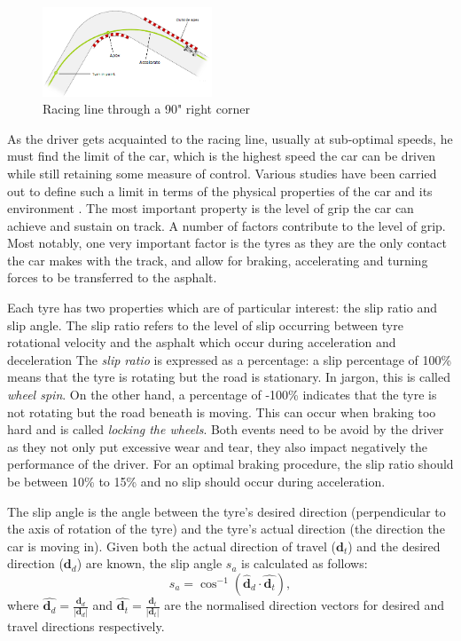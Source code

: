 \documentclass{sig-alternate}
\begin{document}
{\begin{figure}[!htb]
	\centering
	\includegraphics[width=0.45\textwidth]{images/cornerraceline}
	\caption{Racing line through a 90" right corner}
	\label{fig:CornerRaceLine}
\end{figure}

As the driver gets acquainted to the racing line, usually at sub-optimal speeds, he must find the limit of the car, which is the highest speed the car can be driven while still retaining some measure of control. Various studies have been carried out to define such a limit in terms of the physical properties of the car and its environment \cite{beckman1991physics}. The most important property is the level of grip the car can achieve and sustain on track. A number of factors contribute to the level of grip. Most notably, one very important factor is the tyres as they are the only contact the car makes with the track, and allow for braking, accelerating and turning forces to be transferred to the asphalt.

Each tyre has two properties which are of particular interest: the slip ratio and slip angle. The slip ratio refers to the level of slip occurring between tyre rotational velocity and the asphalt which occur during acceleration and deceleration The \emph{slip ratio} is expressed as a percentage: a slip percentage of 100\% means that the tyre is rotating but the road is stationary. In jargon, this is called \emph{wheel spin}. On the other hand, a percentage of -100\% indicates that the tyre is not rotating but the road beneath is moving. This can occur when braking too hard and is called \emph{locking the wheels}. Both events need to be avoid by the driver as they not only put excessive wear and tear, they also impact negatively the performance of the driver. For an optimal braking procedure, the slip ratio should be between 10\% to 15\% \cite{GoingFaster} and no slip should occur during acceleration.

The slip angle is the angle between the tyre's desired direction (perpendicular to the axis of rotation of the tyre) and the tyre's actual direction (the direction the car is moving in). Given both the actual direction of travel ($\mathbf{d}_t$) and the desired direction ($\mathbf{d}_d$) are known, the slip angle $s_a$ is calculated as follows:
\begin{equation}
s_a = \cos^{-1}(\hat{\mathbf{d}}_d \cdot \hat{\mathbf{d}_t}),
\end{equation}
\noindent where $\hat{\mathbf{d}_d} = \frac{\mathbf{d}_d}{|\mathbf{d}_d|}$ and $\hat{\mathbf{d}_t} = \frac{\mathbf{d}_t}{|\mathbf{d}_t|}$ are the normalised direction vectors for desired and travel directions respectively.

}
\end{document}

